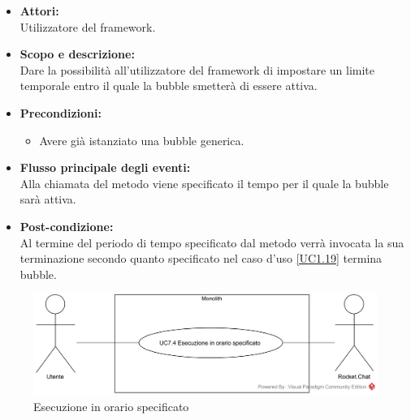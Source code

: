 \begin{itemize}
	\item \textbf{Attori:}
	\\Utilizzatore del framework.
	\item \textbf{Scopo e descrizione:} 
	\\Dare la possibilità all'utilizzatore del framework di impostare un limite temporale entro il quale la bubble smetterà di essere attiva.
	\item \textbf{Precondizioni:}
	\begin{itemize}
		\item Avere già istanziato una bubble generica.
	\end{itemize}
	\item \textbf{Flusso principale degli eventi:}
	\\Alla chiamata del metodo viene specificato il tempo per il quale la bubble sarà attiva.
	\item \textbf{Post-condizione:}
	\\Al termine del periodo di tempo specificato dal metodo verrà invocata la sua terminazione secondo quanto specificato nel caso d'uso \ref{UC1.19} termina bubble.
\end{itemize}

\begin{samepage}
\nopagebreak
\begin{figure}[H]
	\centering
	\includegraphics[width=15cm]{../../documenti/AnalisiDeiRequisiti/Diagrammi_img/usecase/uc1_16.png}
	\caption{\UCFCaption{} Esecuzione in orario specificato}
\end{figure}
\end{samepage}

